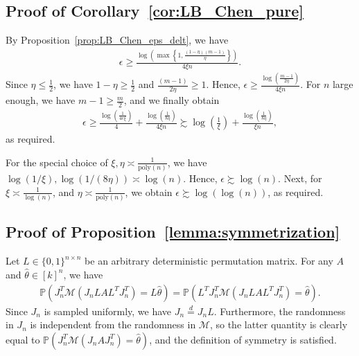 \documentclass{article}
\begin{document}

\subsection{Proof of Corollary~\ref{cor:LB_Chen_pure}}
\label{AppPropLBPure}

By Proposition~\ref{prop:LB_Chen_eps_delt}, we have 
\begin{align*}
\epsilon \geq \frac{\log\left(\max\left\{1, \frac{(1 - \eta)(m - 1)}{\eta}\right\}\right)}{4\xi n}.   
\end{align*}
Since $\eta \leq \frac{1}{2}$, we have $1 - \eta \geq \frac{1}{2}$ and $\frac{(m - 1)}{2\eta} \geq 1$. Hence, $\epsilon \geq \frac{\log\left(\frac{m - 1}{2\eta}\right)}{4\xi n}$. For $n$ large enough, we have $m - 1 \geq \frac{m}{2}$, and we finally obtain
\begin{align*}
\epsilon \geq \frac{\log\left(\frac{1}{4e\xi}\right)}{4} + \frac{\log\left(\frac{1}{8\eta}\right)}{4\xi n} \succsim \log\left(\frac{1}{\xi}\right) + \frac{\log\left(\frac{1}{8\eta}\right)}{\xi n},
\end{align*}
as required.

For the special choice of $\xi, \eta \asymp \frac{1}{\mathrm{poly}(n)}$, we have $\log(1/\xi), \log(1/(8\eta)) \asymp \log(n)$. Hence, $\epsilon \succsim \log(n)$. Next, for $\xi \asymp \frac{1}{\log(n)}$, and $\eta \asymp \frac{1}{\mathrm{poly}(n)}$, we obtain $\epsilon \succsim \log(\log(n))$, as required. 


\subsection{Proof of Proposition~\ref{lemma:symmetrization}}
\label{AppLemSym}

Let $L \in \{0, 1\}^{n \times n}$ be an arbitrary deterministic permutation matrix. For any $A$ and $\hat{\theta} \in [k]^n$, we have
\begin{align*}
\mathbb{P}(J_n^T\mathcal{M}(J_nLAL^TJ_n^T) = L\hat{\theta}) = \mathbb{P}(L^TJ_n^T\mathcal{M}(J_nLAL^TJ_n^T) = \hat{\theta}).
\end{align*}
Since $J_n$ is sampled uniformly, we have $J_n \stackrel{d}{=} J_nL$. Furthermore, the randomness in $J_n$ is independent from the randomness in $\mathcal{M}$, so the latter quantity is clearly equal to $\mathbb{P}(J_n^T\mathcal{M}(J_nAJ_n^T) = \hat{\theta})$,
and the definition of symmetry is satisfied.

\end{document}
